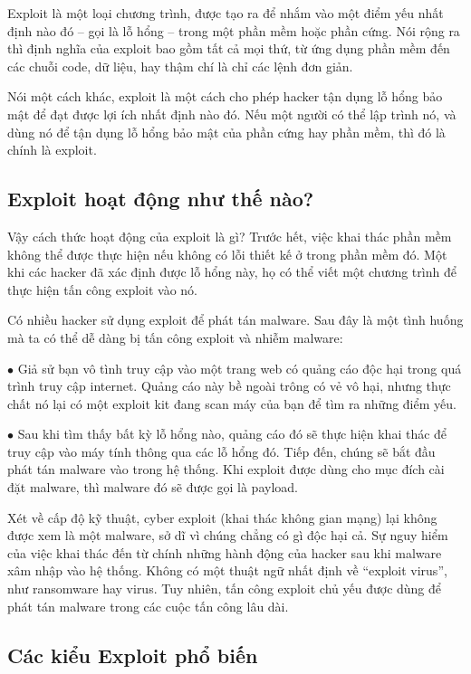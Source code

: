\documentclass{article}
\begin{document}
Exploit là một loại chương trình, được tạo ra để nhắm vào một điểm yếu nhất định nào đó – gọi là lỗ hổng – trong một phần mềm hoặc phần cứng. Nói rộng ra thì định nghĩa của exploit bao gồm tất cả mọi thứ, từ ứng dụng phần mềm đến các chuỗi code, dữ liệu, hay thậm chí là chỉ các lệnh đơn giản.

Nói một cách khác, exploit là một cách cho phép hacker tận dụng lỗ hổng bảo mật để đạt được lợi ích nhất định nào đó. Nếu một người có thể lập trình nó, và dùng nó để tận dụng lỗ hổng bảo mật của phần cứng hay phần mềm, thì đó là chính là exploit.

\subsection{Exploit hoạt động như thế nào?}
Vậy cách thức hoạt động của exploit là gì? Trước hết, việc khai thác phần mềm không thể được thực hiện nếu không có lỗi thiết kế ở trong phần mềm đó. Một khi các hacker đã xác định được lỗ hổng này, họ có thể viết một chương trình để thực hiện tấn công exploit vào nó.

Có nhiều hacker sử dụng exploit để phát tán malware. Sau đây là một tình huống mà ta có thể dễ dàng bị tấn công exploit và nhiễm malware:


$\bullet$ Giả sử bạn vô tình truy cập vào một trang web có quảng cáo độc hại trong quá trình truy cập internet. Quảng cáo này bề ngoài trông có vẻ vô hại, nhưng thực chất nó lại có một exploit kit đang scan máy của bạn để tìm ra những điểm yếu.

$\bullet$ Sau khi tìm thấy bất kỳ lỗ hổng nào, quảng cáo đó sẽ thực hiện khai thác để truy cập vào máy tính thông qua các lỗ hổng đó. Tiếp đến, chúng sẽ bắt đầu phát tán malware vào trong hệ thống. Khi exploit được dùng cho mục đích cài đặt malware, thì malware đó sẽ được gọi là payload.

Xét về cấp độ kỹ thuật, cyber exploit (khai thác không gian mạng) lại không được xem là một malware, sở dĩ vì chúng chẳng có gì độc hại cả. Sự nguy hiểm của việc khai thác đến từ chính những hành động của hacker sau khi malware xâm nhập vào hệ thống. Không có một thuật ngữ nhất định về “exploit virus”, như ransomware hay virus. Tuy nhiên, tấn công exploit chủ yếu được dùng để phát tán malware trong các cuộc tấn công lâu dài.

\subsection{Các kiểu Exploit phổ biến}
\end{document}
